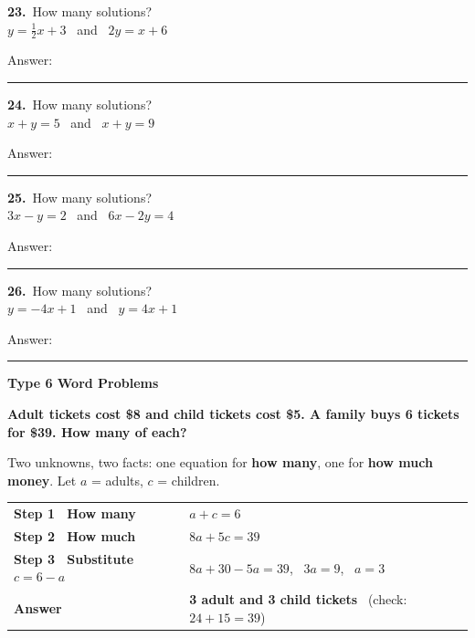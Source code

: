 \documentclass[11pt,letterpaper]{article}
\newcommand{\topicbar}[1]{\needspace{4.5cm}\par\vspace{5mm}
  \begin{tcolorbox}[enhanced,colback=fmtitle,colframe=fmtitle,arc=2mm,left=4mm,top=1.5mm,bottom=1.5mm]
  \color{white}\bfseries\large #1
  \end{tcolorbox}}
\begin{document}
\needspace{3.1cm}\par\vspace{3mm}\noindent \begin{minipage}[t][2.6cm]{0.48\linewidth}\raggedright{\color{fmturn}\bfseries 23.}\ How many solutions? \\ $y = \tfrac12 x + 3$ \ and \ $2y = x + 6$\par\vfill\hfill Answer:\ \rule{3.2cm}{0.4pt}\end{minipage}\hfill \begin{minipage}[t][2.6cm]{0.48\linewidth}\raggedright{\color{fmturn}\bfseries 24.}\ How many solutions? \\ $x + y = 5$ \ and \ $x + y = 9$\par\vfill\hfill Answer:\ \rule{3.2cm}{0.4pt}\end{minipage}\par
\needspace{3.1cm}\par\vspace{3mm}\noindent \begin{minipage}[t][2.6cm]{0.48\linewidth}\raggedright{\color{fmturn}\bfseries 25.}\ How many solutions? \\ $3x - y = 2$ \ and \ $6x - 2y = 4$\par\vfill\hfill Answer:\ \rule{3.2cm}{0.4pt}\end{minipage}\hfill \begin{minipage}[t][2.6cm]{0.48\linewidth}\raggedright{\color{fmturn}\bfseries 26.}\ How many solutions? \\ $y = -4x + 1$ \ and \ $y = 4x + 1$\par\vfill\hfill Answer:\ \rule{3.2cm}{0.4pt}\end{minipage}\par
\needspace{9cm}\topicbar{Type 6 \quad Word Problems}
\begin{watchme}\textbf{Adult tickets cost \$8 and child tickets cost \$5. A family buys 6 tickets for \$39. How many of each?}\par\vspace{1mm}Two unknowns, two facts: one equation for \textbf{how many}, one for \textbf{how much money}. Let $a$ = adults, $c$ = children.\par\vspace{1mm}
\renewcommand{\arraystretch}{2.0}\begin{tabular}{@{}l l@{}}
\textbf{Step 1 \ How many} & $a + c = 6$\\
\textbf{Step 2 \ How much} & $8a + 5c = 39$\\
\textbf{Step 3 \ Substitute $c = 6 - a$} & $8a + 30 - 5a = 39$, \ $3a = 9$, \ $a = 3$\\
\textbf{Answer} & \textbf{3 adult and 3 child tickets} \ (check: $24 + 15 = 39$)
\end{tabular}\end{watchme}
\end{document}
